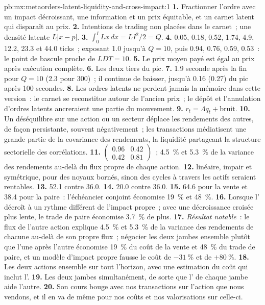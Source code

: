 \begin{solution}{pb:mx:metaorders-latent-liquidity-and-cross-impact:1}
\textbf{1.} Fractionner l'ordre avec un impact décroissant, une information et un prix équitable, et un carnet latent qui disparaît au prix.
\textbf{2.} Intentions de trading non placées dans le carnet~; une densité latente $L|x-p|$.
\textbf{3.} $\int_0^ILx\,dx=LI^2/2=Q$.
\textbf{4.} 0.05, 0.18, 0.52, 1.74, 4.9, 12.2, 23.3 et 44.0 ticks~; exposant 1.0 jusqu'à $Q=10$, puis 0.94, 0.76, 0.59, 0.53~: le point de bascule proche de $LDT=10$.
\textbf{5.} Le prix moyen payé est égal au prix après exécution complète.
\textbf{6.} Les deux tiers du pic.
\textbf{7.} 1.9 seconde après la fin pour $Q=10$ (2.3 pour 300)~; il continue de baisser, jusqu'à 0.16 (0.27) du pic après 100 secondes.
\textbf{8.} Les ordres latents ne perdent jamais la mémoire dans cette version~: le carnet se reconstitue autour de l'ancien prix~; le dépôt et l'annulation d'ordres latents
ancreraient une partie du mouvement.
\textbf{9.} $r_t=\Lambda q_t+\text{bruit}$.
\textbf{10.} Un déséquilibre sur une action ou un secteur déplace les rendements des autres, de façon persistante, souvent négativement~; les transactions médiatisent une grande partie de la covariance des rendements,
la liquidité partageant la structure sectorielle des corrélations.
\textbf{11.} $\begin{pmatrix}0.96&0.42\\0.42&0.81\end{pmatrix}$~; 4.5~\% et 5.3~\% de la variance des rendements au-delà du flux propre de chaque action.
\textbf{12.}  linéaire, impair et symétrique, pour des noyaux bornés, sinon des cycles à travers les actifs seraient rentables.
\textbf{13.} 52.1 contre 36.0.
\textbf{14.} 20.0 contre 36.0.
\textbf{15.} 64.6 pour la vente et 38.4 pour la paire~: l'échéancier conjoint économise 19~\% et 48~\%.
\textbf{16.} Lorsque l' décroît à un rythme différent de l'impact propre~; avec une décroissance croisée plus lente, le trade de paire économise 3.7~\% de plus.
\textbf{17.} \emph{Résultat notable}~: le flux de l'autre action explique 4.5~\% et 5.3~\% de la variance des rendements de chacune au-delà de son propre flux~; négocier les deux jambes ensemble
plutôt que l'une après l'autre économise 19~\% du coût de la vente et 48~\% du trade de paire, et un modèle d'impact propre fausse le coût de $-31~\%$ et de $+80~\%$.
\textbf{18.} Les deux actions ensemble sur tout l'horizon, avec une estimation du coût qui inclut l'.
\textbf{19.} Les deux jambes simultanément, de sorte que l' de chaque jambe aide l'autre.
\textbf{20.} Son cours bouge avec nos transactions sur l'action que nous vendons, et il en va de même pour nos coûts et nos valorisations sur celle-ci.
\end{solution}


